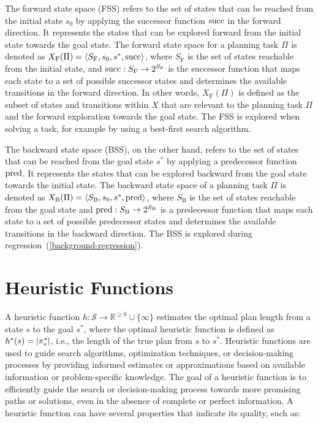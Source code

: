 \documentclass[ppgc,diss,english]{iiufrgs}
\begin{document}
The forward state space (FSS) refers to the set of states that can be reached from the initial state $s_0$ by applying the successor function $\operatorname{succ}$ in the forward direction. It represents the states that can be explored forward from the initial state towards the goal state. The forward state space for a planning task $\Pi$ is denoted as $X_{\text{F}}(\Pi) = \langle S_{\text{F}}, s_0, s^{*}, \operatorname{succ} \rangle$, where $S_{\text{F}}$ is the set of states reachable from the initial state, and $\operatorname{succ} : S_{\text{F}} \to 2^{S_{\text{F}}}$ is the successor function that maps each state to a set of possible successor states and determines the available transitions in the forward direction. In other words, $X_{\text{F}}(\Pi)$ is defined as the subset of states and transitions within $X$ that are relevant to the planning task $\Pi$ and the forward exploration towards the goal state. The FSS is explored when solving a task, for example by using a best-first search algorithm.

The backward state space (BSS), on the other hand, refers to the set of states that can be reached from the goal state $s^{*}$ by applying a predecessor function $\operatorname{pred}$. It represents the states that can be explored backward from the goal state towards the initial state. The backward state space of a planning task $\Pi$ is denoted as $X_{\text{B}}(\Pi) = \langle S_{\text{B}}, s_{0}, s^{*}, \operatorname{pred} \rangle$, where $S_{\text{B}}$ is the set of states reachable from the goal state and $\operatorname{pred} : S_{\text{B}} \to 2^{S_{\text{B}}}$ is a predecessor function that maps each state to a set of possible predecessor states and determines the available transitions in the backward direction. The BSS is explored during regression~(\cref{background-regression}).


\section{Heuristic Functions}
\label{sec:background-heuristics}
A heuristic function $h:\mathcal{S}\rightarrow \mathbb{R}^{\geq 0}\cup\{\infty\}$ estimates the optimal plan length from a state $s$ to the goal $s^*$, where the optimal heuristic function is defined as $h^{*}(s) = |\pi_{s}^{*}|$, i.e., the length of the true plan from $s$ to $s^{*}$. Heuristic functions are used to guide search algorithms, optimization techniques, or decision-making processes by providing informed estimates or approximations based on available information or problem-specific knowledge. The goal of a heuristic function is to efficiently guide the search or decision-making process towards more promising paths or solutions, even in the absence of complete or perfect information. A heuristic function can have several properties that indicate its quality, such as:
\end{document}

